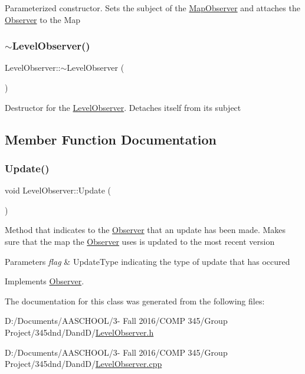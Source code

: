 Parameterized constructor. Sets the subject of the \hyperlink{class_map_observer}{Map\+Observer} and attaches the \hyperlink{class_observer}{Observer} to the Map \hypertarget{class_level_observer_a1d36fff128f92b806f8cb0e9c5dd317f}{}\label{class_level_observer_a1d36fff128f92b806f8cb0e9c5dd317f} 
\subsubsection{\texorpdfstring{$\sim$\+Level\+Observer()}{~LevelObserver()}}
{\footnotesize\ttfamily Level\+Observer\+::$\sim$\+Level\+Observer (\begin{DoxyParamCaption}{ }\end{DoxyParamCaption})}

Destructor for the \hyperlink{class_level_observer}{Level\+Observer}. Detaches itself from its subject 

\subsection{Member Function Documentation}
\hypertarget{class_level_observer_af6107e84befc375ee764f52dd3061d9f}{}\label{class_level_observer_af6107e84befc375ee764f52dd3061d9f} 
\subsubsection{\texorpdfstring{Update()}{Update()}}
{\footnotesize\ttfamily void Level\+Observer\+::\+Update (\begin{DoxyParamCaption}{ }\end{DoxyParamCaption})\hspace{0.3cm}{\ttfamily [virtual]}}

Method that indicates to the \hyperlink{class_observer}{Observer} that an update has been made. Makes sure that the map the \hyperlink{class_observer}{Observer} uses is updated to the most recent version 
\begin{DoxyParams}{Parameters}
{\em flag} & Update\+Type indicating the type of update that has occured \\
\hline
\end{DoxyParams}


Implements \hyperlink{class_observer}{Observer}.



The documentation for this class was generated from the following files\+:\begin{DoxyCompactItemize}
\item 
D\+:/\+Documents/\+A\+A\+S\+C\+H\+O\+O\+L/3-\/ Fall 2016/\+C\+O\+M\+P 345/\+Group Project/345dnd/\+Dand\+D/\hyperlink{_level_observer_8h}{Level\+Observer.\+h}\item 
D\+:/\+Documents/\+A\+A\+S\+C\+H\+O\+O\+L/3-\/ Fall 2016/\+C\+O\+M\+P 345/\+Group Project/345dnd/\+Dand\+D/\hyperlink{_level_observer_8cpp}{Level\+Observer.\+cpp}\end{DoxyCompactItemize}
